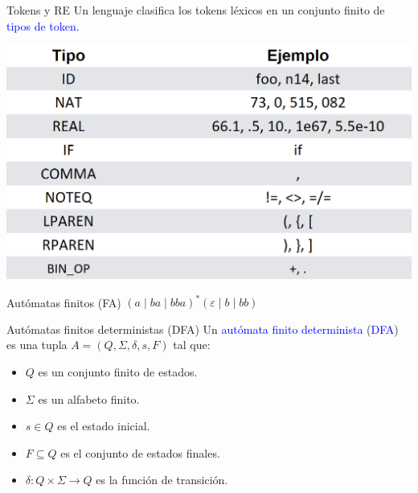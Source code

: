 \documentclass[handout]{beamer} %
\newcommand{\blue}[1]{\textcolor{blue}{#1}}
\begin{document}
\begin{frame}{Tokens y RE}
    Un lenguaje clasifica los tokens léxicos en un conjunto finito de \blue{tipos de token}.
    \pause
    \begin{center}
      \includegraphics[width=.8\textwidth]{./image/cap2/tipos-token}
    \end{center}
\end{frame}

\begin{frame}{Autómatas finitos (FA)}
  $(a\mid ba\mid bba)^*(\varepsilon\mid b\mid bb)$
  \begin{center}
  \end{center}
\end{frame}

\begin{frame}{Autómatas finitos deterministas (DFA)}
  Un \blue{autómata finito determinista} (\blue{DFA}) es una tupla $A=(Q,\Sigma,\delta,s,F)$ tal que:
 \begin{itemize}
  \item $Q$ es un conjunto finito de estados.
  \item $\Sigma$ es un alfabeto finito.
  \item $s\in Q$ es el estado inicial.
  \item $F\subseteq Q$ es el conjunto de estados finales.
  \item $\delta:Q\times\Sigma \to Q$ es la función de transición.
 \end{itemize}
\end{frame}
\end{document}
